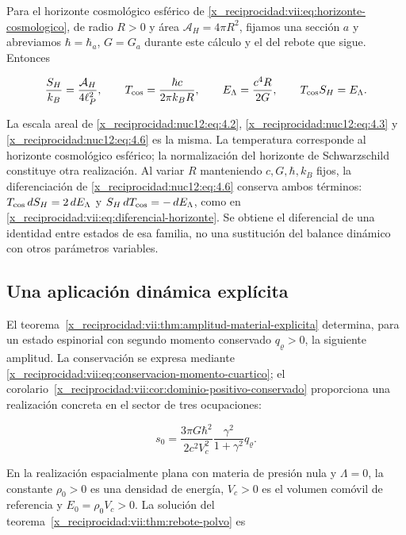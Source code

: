 Para el horizonte cosmológico esférico de \eqref{x_reciprocidad:vii:eq:horizonte-cosmologico}, de radio \(R>0\) y área \(\mathcal A_H=4\pi R^2\), fijamos una sección \(a\) y abreviamos \(\hbar=\hbar_a\), \(G=G_a\) durante este cálculo y el del rebote que sigue. Entonces



\begin{equation}
\frac{S_H}{k_B}=\frac{\mathcal A_H}{4\ell_P^2},\qquad
T_{\rm cos}=\frac{\hbar c}{2\pi k_BR},\qquad
E_\Lambda=\frac{c^4R}{2G},\qquad T_{\rm cos}S_H=E_\Lambda .
\label{x_reciprocidad:nuc12:eq:4.6}
\end{equation}



La escala areal de \eqref{x_reciprocidad:nuc12:eq:4.2}, \eqref{x_reciprocidad:nuc12:eq:4.3} y \eqref{x_reciprocidad:nuc12:eq:4.6} es la misma. La temperatura corresponde al horizonte cosmológico esférico; la normalización del horizonte de Schwarzschild constituye otra realización. Al variar \(R\) manteniendo \(c,G,\hbar,k_B\) fijos, la diferenciación de \eqref{x_reciprocidad:nuc12:eq:4.6} conserva ambos términos: \(T_{\rm cos}\,dS_H=2\,dE_\Lambda\) y \(S_H\,dT_{\rm cos}=-\,dE_\Lambda\), como en \eqref{x_reciprocidad:vii:eq:diferencial-horizonte}. Se obtiene el diferencial de una identidad entre estados de esa familia, no una sustitución del balance dinámico con otros parámetros variables.

\subsection{Una aplicación dinámica explícita}

El teorema~\ref{x_reciprocidad:vii:thm:amplitud-material-explicita} determina, para un estado espinorial con segundo momento conservado \(q_\varrho>0\), la siguiente amplitud. La conservación se expresa mediante \eqref{x_reciprocidad:vii:eq:conservacion-momento-cuartico}; el corolario~\ref{x_reciprocidad:vii:cor:dominio-positivo-conservado} proporciona una realización concreta en el sector de tres ocupaciones:



\begin{equation}
s_0=\frac{3\pi G\hbar^2}{2c^2V_c^2}
\frac{\gamma^2}{1+\gamma^2}q_\varrho .
\label{x_reciprocidad:nuc12:eq:4.7}
\end{equation}



En la realización espacialmente plana con materia de presión nula y \(\Lambda=0\), la constante \(\rho_0>0\) es una densidad de energía, \(V_c>0\) es el volumen comóvil de referencia y \(E_0=\rho_0V_c>0\). La solución del teorema~\ref{x_reciprocidad:vii:thm:rebote-polvo} es



